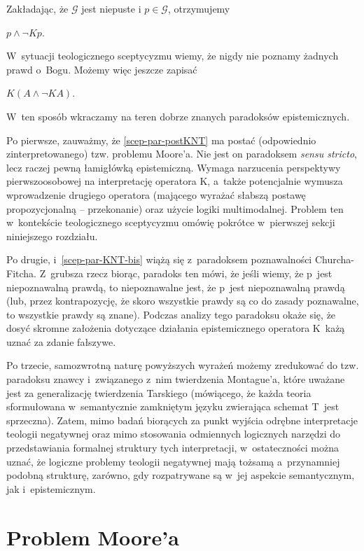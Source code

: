 Zakładając, że $\mathcal{G}$ jest niepuste i $p \in \mathcal{G}$, otrzymujemy

$p \land \neg K p$.\label{scep-par-postKNT}

W~sytuacji teologicznego sceptycyzmu wiemy, że nigdy nie poznamy żadnych prawd o~Bogu. Możemy więc jeszcze zapisać

$K(A \land \neg K A)$.\label{scep-par-KNT-bis}

W~ten sposób wkraczamy na teren dobrze znanych paradoksów epistemicznych.

Po pierwsze, zauważmy, że \ref{scep-par-postKNT} ma postać (odpowiednio zinterpretowanego) tzw. problemu Moore'a. Nie jest on paradoksem \textit{sensu stricto}, lecz raczej pewną łamigłówką epistemiczną. Wymaga narzucenia perspektywy pierwszoosobowej na interpretację operatora K, a~także potencjalnie wymusza wprowadzenie drugiego operatora (mającego wyrażać słabszą postawę propozycjonalną -- przekonanie) oraz użycie logiki multimodalnej. Problem ten w~kontekście teologicznego sceptycyzmu omówię pokrótce w~pierwszej sekcji niniejszego rozdziału.

Po drugie, \label{scep-par-postKNT} i~\ref{scep-par-KNT-bis} wiążą się z~paradoksem poznawalności Churcha-Fitcha. Z~grubsza rzecz biorąc, paradoks ten mówi, że jeśli wiemy, że p~jest niepoznawalną prawdą, to niepoznawalne jest, że p~jest niepoznawalną prawdą (lub, przez kontrapozycję, że skoro wszystkie prawdy są co do zasady poznawalne, to wszystkie prawdy są znane). Podczas analizy tego paradoksu okaże się, że dosyć skromne założenia dotyczące działania epistemicznego operatora K~każą uznać \label{scep-par-KNT-bis} za zdanie fałszywe.

Po trzecie, samozwrotną naturę powyższych wyrażeń możemy zredukować do tzw. paradoksu znawcy i~związanego z~nim twierdzenia Montague'a, które uważane jest za generalizację twierdzenia Tarskiego (mówiącego, że każda teoria sformułowana w~semantycznie zamkniętym języku zwierająca schemat T~jest sprzeczna). Zatem, mimo badań biorących za punkt wyjścia odrębne interpretacje teologii negatywnej oraz mimo stosowania odmiennych logicznych narzędzi do przedstawiania formalnej struktury tych interpretacji, w~ostateczności można uznać, że logiczne problemy teologii negatywnej mają tożsamą a~przynamniej podobną strukturę, zarówno, gdy rozpatrywane są w~jej aspekcie semantycznym, jak i~epistemicznym.


\section{Problem Moore'a}\label{scep-par-problemmoorea}

